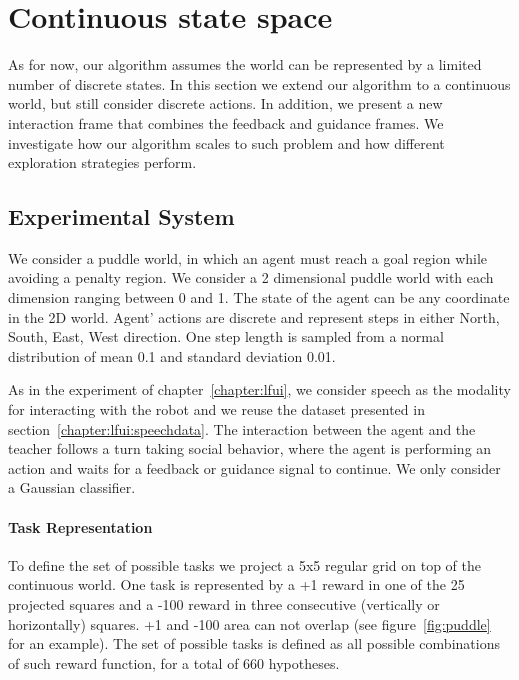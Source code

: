 \section{Continuous state space}
\label{chapter:limitations:continousstate}


As for now, our algorithm assumes the world can be represented by a limited number of discrete states. In this section we extend our algorithm to a continuous world, but still consider discrete actions. In addition, we present a new interaction frame that combines the feedback and guidance frames. We investigate how our algorithm scales to such problem and how different exploration strategies perform.

\subsection{Experimental System}

We consider a puddle world, in which an agent must reach a goal region while avoiding a penalty region. We consider a 2 dimensional puddle world with each dimension ranging between 0 and 1. The state of the agent can be any coordinate in the 2D world. Agent' actions are discrete and represent steps in either North, South, East, West direction. One step length is sampled from a normal distribution of mean 0.1 and standard deviation 0.01.

As in the experiment of chapter~\ref{chapter:lfui}, we consider speech as the modality for interacting with the robot and we reuse the dataset presented in section~\ref{chapter:lfui:speechdata}. The interaction between the agent and the teacher follows a turn taking social behavior, where the agent is performing an action and waits for a feedback or guidance signal to continue. We only consider a Gaussian classifier.

\paragraph{Task Representation} 

To define the set of possible tasks we project a 5x5 regular grid on top of the continuous world. One task is represented by a +1 reward in one of the 25 projected squares and a -100 reward in three consecutive (vertically or horizontally) squares. +1 and -100 area can not overlap (see figure~\ref{fig:puddle} for an example). The set of possible tasks is defined as all possible combinations of such reward function, for a total of 660 hypotheses.

